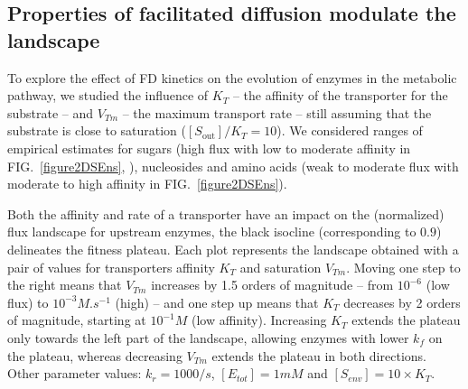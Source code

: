 \documentclass[11pt,onecolumn]{article}
\providecommand{\DIFdel}[1]{{\protect\color{red} \scriptsize #1}} %
\providecommand{\DIFdelbegin}{} %
\providecommand{\DIFdelFL}[1]{\DIFdel{#1}} %
\begin{document}
\subsection{Properties of facilitated diffusion modulate the landscape}

To explore the effect of FD kinetics on the evolution of enzymes in the metabolic pathway, we studied the influence of  $K_T$ -- the affinity of the transporter for the substrate -- and $V_{Tm}$ -- the maximum transport rate -- still assuming that the substrate is close to saturation ($[S_\text{out}]/K_T=10$). We \DIFdelbegin \DIFdel{considered ranges of empirical estimates for sugars (high flux with low to moderate affinity in FIG.~\ref{figure2DSEns}, \citep{Stein86d,Maier02}), nucleosides \citep{Griffith96} and amino acids \citep{Stein86d,Zampieri2019} (weak to moderate flux with moderate to high affinity in FIG.~\ref{figure2DSEns}).   
}%

{%
\DIFdelFL{Both the affinity and rate of a transporter have an impact on the (normalized) flux landscape for upstream enzymes, the black isocline (corresponding to $0.9$) delineates the fitness plateau. Each plot represents the landscape obtained with a pair of values for transporters affinity $K_T$ and saturation $V_{Tm}$. Moving one step to the right means that $V_{Tm}$ increases by 1.5 orders of magnitude -- from $10^{-6}$ (low flux) to $10^{-3} M.s^{-1}$ (high) -- and one step up means that $K_T$ decreases by 2 orders of magnitude, starting at $10^{-1}M$ (low affinity). Increasing $K_T$ extends the plateau only towards the left part of the landscape, allowing enzymes with lower $k_f$ on the plateau, whereas decreasing $V_{Tm}$ extends the plateau in both directions. Other parameter values: $k_r=1000/s$, $[E_{tot}]=1mM$ and $[S_{env}]=10 \times K_T$.}}
\end{document}
